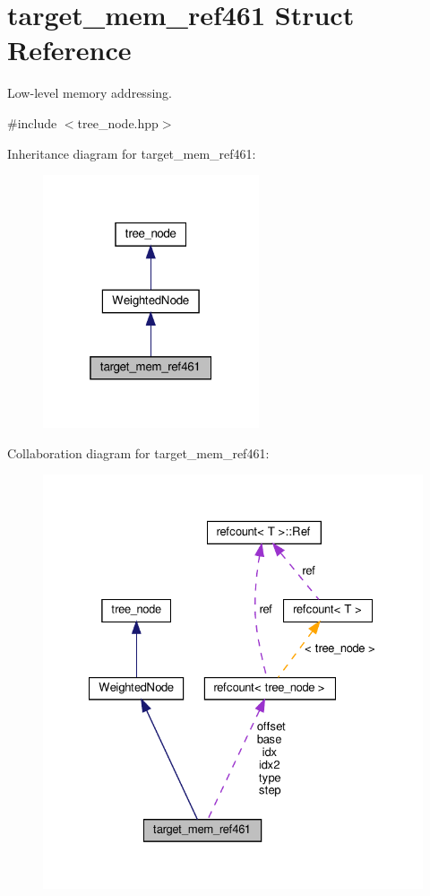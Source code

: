 \hypertarget{structtarget__mem__ref461}{}\section{target\+\_\+mem\+\_\+ref461 Struct Reference}
\label{structtarget__mem__ref461}


Low-\/level memory addressing.  




{\ttfamily \#include $<$tree\+\_\+node.\+hpp$>$}



Inheritance diagram for target\+\_\+mem\+\_\+ref461\+:
\nopagebreak
\begin{figure}[H]
\begin{center}
\leavevmode
\includegraphics[width=181pt]{d3/d99/structtarget__mem__ref461__inherit__graph}
\end{center}
\end{figure}


Collaboration diagram for target\+\_\+mem\+\_\+ref461\+:
\nopagebreak
\begin{figure}[H]
\begin{center}
\leavevmode
\includegraphics[width=327pt]{d1/dc2/structtarget__mem__ref461__coll__graph}
\end{center}
\end{figure}
